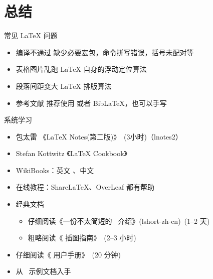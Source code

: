 
\section{总结}

\begin{frame}{常见 \LaTeX{} 问题}
  \begin{itemize}
    \item \alert{编译不通过} 缺少必要宏包，命令拼写错误，括号未配对等
    \item \alert{表格图片乱跑} \LaTeX{} 自身的浮动定位算法
    \item \alert{段落间距变大} \LaTeX{} 排版算法
    \item \alert{参考文献} 推荐使用 \BibTeX{} 或者 Bib\LaTeX{}，也可以手写  
  \end{itemize}
\end{frame}

\begin{frame}{系统学习}
  \begin{itemize}
      \item 包太雷 《\LaTeX{} Notes(第二版)》~(3小时)（lnotes2） 
      \item Stefan Kottwitz 《LaTeX Cookbook》
      \item WikiBooks：英文 、中文 
      \item 在线教程：ShareLaTeX、OverLeaf 都有帮助
      \item 经典文档
        \begin{itemize}
          \item 仔细阅读《一份不太简短的~\LaTeXe{} 介绍》(lshort-zh-cn)~(1--2 天)
          \item 粗略阅读《\LaTeXe{} 插图指南》~(2--3 小时)
        \end{itemize}
      \item 仔细阅读《\ThuThesis{} 用户手册》~(20 分钟)
      \item 从~\ThuThesis{} 示例文档入手
  \end{itemize}
\end{frame}

